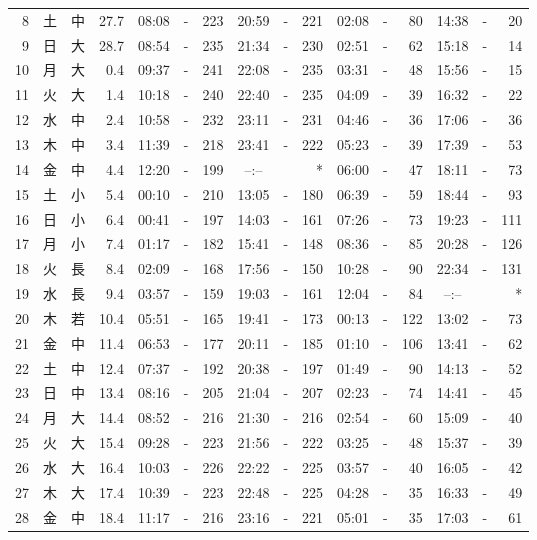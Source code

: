 \documentclass[12pt.a4j]{jsarticle}
\begin{document}
\begin{center}
\begin{table}[ht]
\begin{tabular}{|rc|cr|ccrccr|ccrccr|}
 8 & 土 & 中 & 27.7 & 08:08 &-& 223 & 20:59 &-& 221 & 02:08 &-&  80 & 14:38 &-&  20 \\
 9 & 日 & 大 & 28.7 & 08:54 &-& 235 & 21:34 &-& 230 & 02:51 &-&  62 & 15:18 &-&  14 \\
10 & 月 & 大 &  0.4 & 09:37 &-& 241 & 22:08 &-& 235 & 03:31 &-&  48 & 15:56 &-&  15 \\
11 & 火 & 大 &  1.4 & 10:18 &-& 240 & 22:40 &-& 235 & 04:09 &-&  39 & 16:32 &-&  22 \\
12 & 水 & 中 &  2.4 & 10:58 &-& 232 & 23:11 &-& 231 & 04:46 &-&  36 & 17:06 &-&  36 \\
13 & 木 & 中 &  3.4 & 11:39 &-& 218 & 23:41 &-& 222 & 05:23 &-&  39 & 17:39 &-&  53 \\
14 & 金 & 中 &  4.4 & 12:20 &-& 199 & --:-- & &  *  & 06:00 &-&  47 & 18:11 &-&  73 \\
15 & 土 & 小 &  5.4 & 00:10 &-& 210 & 13:05 &-& 180 & 06:39 &-&  59 & 18:44 &-&  93 \\
16 & 日 & 小 &  6.4 & 00:41 &-& 197 & 14:03 &-& 161 & 07:26 &-&  73 & 19:23 &-& 111 \\
17 & 月 & 小 &  7.4 & 01:17 &-& 182 & 15:41 &-& 148 & 08:36 &-&  85 & 20:28 &-& 126 \\
18 & 火 & 長 &  8.4 & 02:09 &-& 168 & 17:56 &-& 150 & 10:28 &-&  90 & 22:34 &-& 131 \\
19 & 水 & 長 &  9.4 & 03:57 &-& 159 & 19:03 &-& 161 & 12:04 &-&  84 & --:-- & &  *  \\
20 & 木 & 若 & 10.4 & 05:51 &-& 165 & 19:41 &-& 173 & 00:13 &-& 122 & 13:02 &-&  73 \\
21 & 金 & 中 & 11.4 & 06:53 &-& 177 & 20:11 &-& 185 & 01:10 &-& 106 & 13:41 &-&  62 \\
22 & 土 & 中 & 12.4 & 07:37 &-& 192 & 20:38 &-& 197 & 01:49 &-&  90 & 14:13 &-&  52 \\
23 & 日 & 中 & 13.4 & 08:16 &-& 205 & 21:04 &-& 207 & 02:23 &-&  74 & 14:41 &-&  45 \\
24 & 月 & 大 & 14.4 & 08:52 &-& 216 & 21:30 &-& 216 & 02:54 &-&  60 & 15:09 &-&  40 \\
25 & 火 & 大 & 15.4 & 09:28 &-& 223 & 21:56 &-& 222 & 03:25 &-&  48 & 15:37 &-&  39 \\
26 & 水 & 大 & 16.4 & 10:03 &-& 226 & 22:22 &-& 225 & 03:57 &-&  40 & 16:05 &-&  42 \\
27 & 木 & 大 & 17.4 & 10:39 &-& 223 & 22:48 &-& 225 & 04:28 &-&  35 & 16:33 &-&  49 \\
28 & 金 & 中 & 18.4 & 11:17 &-& 216 & 23:16 &-& 221 & 05:01 &-&  35 & 17:03 &-&  61 \\

\end{tabular}
\end{table}
\end{center}
\end{document}
